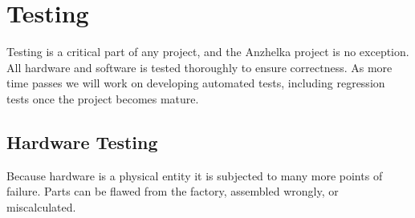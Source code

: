 \documentclass{article}
\numberwithin{equation}{section} %
\begin{document}

\section{Testing}
Testing is a critical part of any project, and the Anzhelka project is no exception. All hardware and software is tested thoroughly to ensure correctness. As more time passes we will work on developing automated tests, including regression tests once the project becomes mature.





\subsection{Hardware Testing}
Because hardware is a physical entity it is subjected to many more points of failure. Parts can be flawed from the factory, assembled wrongly, or miscalculated.
\end{document}
